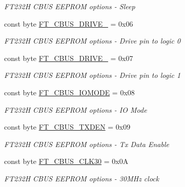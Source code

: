 \begin{DoxyCompactItemize}
\begin{DoxyCompactList}\small\item\em F\+T232H C\+B\+US E\+E\+P\+R\+OM options -\/ Sleep \end{DoxyCompactList}\item 
const byte \mbox{\hyperlink{class_f_t_d2_x_x___n_e_t_1_1_f_t_d_i_1_1_f_t__232_h___c_b_u_s___o_p_t_i_o_n_s_a27cc01720fe09711244ebb3f8a5259b3}{F\+T\+\_\+\+C\+B\+U\+S\+\_\+\+D\+R\+I\+V\+E\+\_}} = 0x06
\begin{DoxyCompactList}\small\item\em F\+T232H C\+B\+US E\+E\+P\+R\+OM options -\/ Drive pin to logic 0 \end{DoxyCompactList}\item 
const byte \mbox{\hyperlink{class_f_t_d2_x_x___n_e_t_1_1_f_t_d_i_1_1_f_t__232_h___c_b_u_s___o_p_t_i_o_n_s_a1944b98e78f58f3d4bafeac52e1aec19}{F\+T\+\_\+\+C\+B\+U\+S\+\_\+\+D\+R\+I\+V\+E\+\_}} = 0x07
\begin{DoxyCompactList}\small\item\em F\+T232H C\+B\+US E\+E\+P\+R\+OM options -\/ Drive pin to logic 1 \end{DoxyCompactList}\item 
const byte \mbox{\hyperlink{class_f_t_d2_x_x___n_e_t_1_1_f_t_d_i_1_1_f_t__232_h___c_b_u_s___o_p_t_i_o_n_s_a369d0e74462336cc95abb3542ef43470}{F\+T\+\_\+\+C\+B\+U\+S\+\_\+\+I\+O\+M\+O\+DE}} = 0x08
\begin{DoxyCompactList}\small\item\em F\+T232H C\+B\+US E\+E\+P\+R\+OM options -\/ IO Mode \end{DoxyCompactList}\item 
const byte \mbox{\hyperlink{class_f_t_d2_x_x___n_e_t_1_1_f_t_d_i_1_1_f_t__232_h___c_b_u_s___o_p_t_i_o_n_s_aebd41882dcd78e40911fc8f2abdda0ab}{F\+T\+\_\+\+C\+B\+U\+S\+\_\+\+T\+X\+D\+EN}} = 0x09
\begin{DoxyCompactList}\small\item\em F\+T232H C\+B\+US E\+E\+P\+R\+OM options -\/ Tx Data Enable \end{DoxyCompactList}\item 
const byte \mbox{\hyperlink{class_f_t_d2_x_x___n_e_t_1_1_f_t_d_i_1_1_f_t__232_h___c_b_u_s___o_p_t_i_o_n_s_a23f3e0362a58e8b42cbb1d53c68bc156}{F\+T\+\_\+\+C\+B\+U\+S\+\_\+\+C\+L\+K30}} = 0x0A
\begin{DoxyCompactList}\small\item\em F\+T232H C\+B\+US E\+E\+P\+R\+OM options -\/ 30M\+Hz clock \end{DoxyCompactList}\item 

\end{DoxyCompactItemize}
